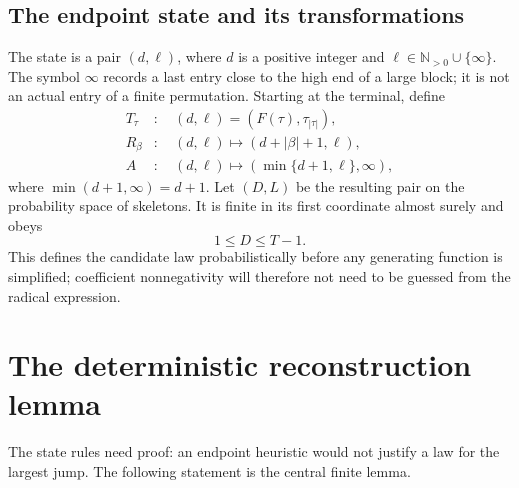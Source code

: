 \documentclass[11pt,a4paper]{article}
\theoremstyle{definition}\newaliascnt{definition}{theorem}
\theoremstyle{remark}\newaliascnt{remark}{theorem}
\newcommand{\N}{\mathbb N}
\begin{document}
\subsection{The endpoint state and its transformations}
The state is a pair $(d,\ell)$, where $d$ is a positive integer and
$\ell\in\N_{>0}\cup\{\infty\}$. The symbol $\infty$ records a last
entry close to the high end of a large block; it is not an actual entry
of a finite permutation. Starting at the terminal, define
\begin{align}
 T_\tau &: \quad (d,\ell)=(F(\tau),\tau_{|\tau|}),
 \label{lj:eq:state-terminal}\\
 R_\beta &: \quad (d,\ell)\longmapsto(d+|\beta|+1,\ell),
 \label{lj:eq:state-right}\\
 A &: \quad (d,\ell)\longmapsto
       (\min\{d+1,\ell\},\infty),
 \label{lj:eq:state-append}
\end{align}
where $\min(d+1,\infty)=d+1$.
Let $(D,L)$ be the resulting pair on the probability space of skeletons.
It is finite in its first coordinate almost surely and obeys
\begin{equation}
 1\le D\le T-1.
 \label{lj:eq:D-cost}
\end{equation}
This defines the candidate law probabilistically before any generating
function is simplified; coefficient nonnegativity will therefore not
need to be guessed from the radical expression.

\section{The deterministic reconstruction lemma}
\label{lj:sec:reconstruction}

The state rules need proof: an endpoint heuristic would not justify a law
for the largest jump. The following statement is the central finite lemma.
\end{document}
